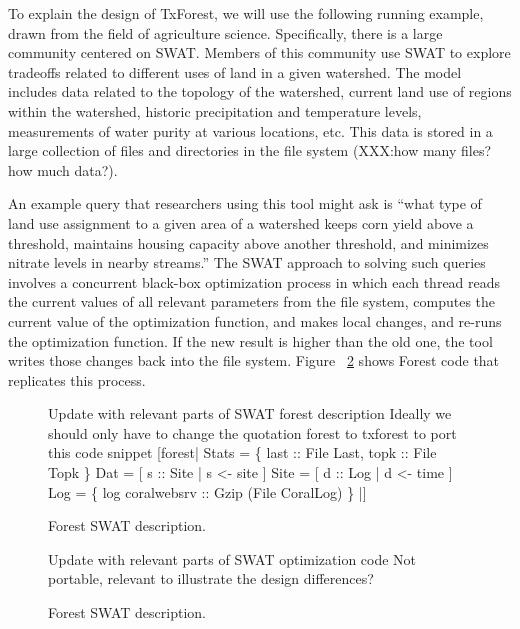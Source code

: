 To explain the design of TxForest, we will use the following running
example, drawn from the field of agriculture science.  Specifically,
there is a large community centered on SWAT.  Members of
this community use SWAT to explore tradeoffs related to different uses
of land in a given watershed.  The model includes data related to the
topology of the watershed, current land use of regions within the
watershed, historic precipitation and temperature levels, measurements
of water purity at various locations, etc.  This data is stored in a
large collection of files and directories in the file system (XXX:how
many files? how much data?).

An example query that researchers using this tool might ask is
``what type of land use assignment to a given area of a watershed
keeps corn yield above a threshold, maintains housing capacity above
another threshold, and minimizes nitrate levels in nearby streams.''
The SWAT approach to solving such queries involves a concurrent black-box
optimization process in which each thread reads the current values of
all relevant parameters from the file system, computes the current
value of the optimization function, and makes local changes, and re-runs
the optimization function. If the new result is higher than the old
one, the tool writes those changes back into the file system.  Figure
~\ref{fig:SWAT-opt-code} shows Forest code that replicates this process.

\begin{figure}
\begin{code}
Update with relevant parts of SWAT forest description   
Ideally we should only have to change the quotation
forest to txforest to port this code snippet
[forest|
  Stats = 
   \{ last :: File Last, topk :: File Topk \}
  Dat   = [ s :: Site | s <-  site ]
  Site  = [ d :: Log  | d <-  time ]
  Log = 
   \{ log  coralwebsrv :: Gzip (File CoralLog) \} |]
\end{code}
\caption{Forest SWAT description. }
\label{fig:SWAT-description}
\end{figure}

\begin{figure}
\begin{code}
Update with relevant parts of SWAT optimization code
Not portable, relevant to illustrate the design differences?
\end{code}
\caption{Forest SWAT description. }
\label{fig:SWAT-opt-code}
\end{figure}



